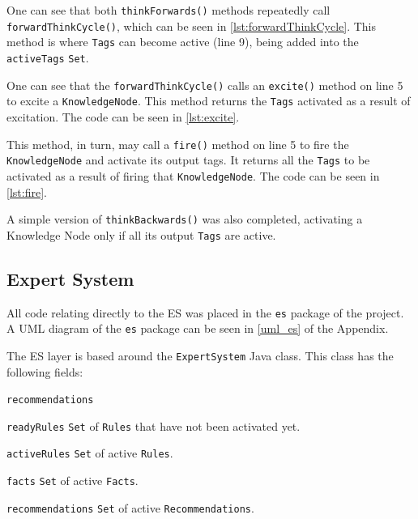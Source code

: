 \documentclass[titlepage,11pt]{article}
\def \knnpath {"C:/Users/Sean/IdeaProjects/Prometheus/src/knn/KnowledgeNodeNetwork.java"}
\newcommand{\code}[1]{\texttt{#1}}
\begin{document}
One can see that both \code{thinkForwards()} methods repeatedly call \code{forwardThinkCycle()}, which can be seen in \autoref{lst:forwardThinkCycle}. This method is where \code{Tags} can become active (line 9), being added into the \code{activeTags} \code{Set}.



One can see that the \code{forwardThinkCycle()} calls an \code{excite()} method on line 5 to excite a \code{KnowledgeNode}. This method returns the \code{Tags} activated as a result of excitation. The code can be seen in \autoref{lst:excite}.



This method, in turn, may call a \code{fire()} method on line 5 to fire the \code{KnowledgeNode} and activate its output tags. It returns all the \code{Tags} to be activated as a result of firing that \code{KnowledgeNode}. The code can be seen in \autoref{lst:fire}.



A simple version of \code{thinkBackwards()} was also completed, activating a Knowledge Node only if all its output \code{Tags} are active.

\subsection{Expert System}

All code relating directly to the ES was placed in the \code{es} package of the project. A UML diagram of the \code{es} package can be seen in \autoref{uml_es} of the Appendix.

The ES layer is based around the \code{ExpertSystem} Java class. This class has the following fields:

\begin{labeling}{\code{recommendations}}
	\item[\code{readyRules}] \code{Set} of \code{Rules} that have not been activated yet.
	\item[\code{activeRules}] \code{Set} of active \code{Rules}.
	\item[\code{facts}] \code{Set} of active \code{Facts}.
	\item[\code{recommendations}] \code{Set} of active \code{Recommendations}.
\end{labeling}
\end{document}
